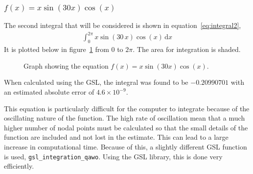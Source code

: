 \documentclass[11pt]{article} %
\newcommand{\inputTikZ}[1]{%
  }
\newcommand{\inputTikZ}[1]{%
    \beginpgfgraphicnamed{#1-external}%
    \endpgfgraphicnamed%
  }
\renewcommand{\d}{\,\mathrm{d}} %
\newcommand{\code}[1]{\texttt{#1}}
\begin{document}
	\subsubsection{$f(x) = x\sin(30x)\cos(x)$}
	The second integral that will be considered is shown in equation~\ref{eq:integral2},
	\begin{align}
		\int_0^{2\pi} x\sin(30\,x)\cos(x)\d{x} \label{eq:integral2}
	\end{align}
	It is plotted below in figure~\ref{fig:graph2} from $0$ to $2\pi$. The area for integration is shaded.
	\begin{figure}[h]
		\centering
			\inputTikZ{Graph2}
		\caption{\label{fig:graph2}Graph showing the equation $f(x) = x\sin(30x)\cos(x)$.}
	\end{figure}
	
	When calculated using the GSL, the integral was found to be $-0.20990701$ with an estimated absolute error of $4.6\times10^{-9}$.

	This equation is particularly difficult for the computer to integrate because of the oscillating nature of the function. The high rate of oscillation mean that a much higher number of nodal points must be calculated so that the small details of the function are included and not lost in the estimate. This can lead to a large increase in computational time. Because of this, a slightly different GSL function is used, \code{gsl\_integration\_qawo}. Using the GSL library, this is done very efficiently. 
\end{document}
